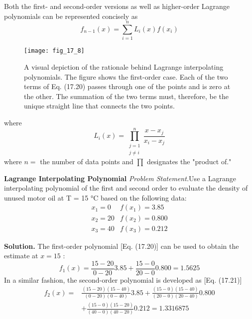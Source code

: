 \documentclass[../main.tex]{subfiles}
\begin{document}
    Both the first- and second-order versions as well as higher-order Lagrange polynomials can be represented concisely as
    \begin{equation}
        \tag{17.22}
    f_{n-1}(x)=\sum_{i=1}^{n} L_{i}(x) f\left(x_{i}\right)
\end{equation}

\begin{figure}[H]
    \centering
    \texttt{[image: fig\_17\_8]}
   \caption{\textsf{A visual depiction of the rationale behind Lagrange interpolating polynomials. The figure shows
   the first-order case. Each of the two terms of Eq. (17.20) passes through one of the points and
   is zero at the other. The summation of the two terms must, therefore, be the unique straight line
   that connects the two points.}}\label{fig:fig_17_8}
\end{figure}

where
\begin{equation}
    \tag{17.23}
L_{i}(x)=\prod_{\substack{j=1 \\ j \neq i}}^{n} \frac{x-x_{j}}{x_{i}-x_{j}}
\end{equation}
where $n=$ the number of data points and $\prod$ designates the "product of."

\begin{exmp} \textbf{Lagrange Interpolating Polynomial}
    \noindent\textit{Problem Statement.}Use a Lagrange interpolating polynomial of the first and second
    order to evaluate the density of unused motor oil at T = 15 °C based on the following data:
    $$
\begin{array}{ll}
x_{1}=0 & f\left(x_{1}\right)=3.85 \\
x_{2}=20 & f\left(x_{2}\right)=0.800 \\
x_{3}=40 & f\left(x_{3}\right)=0.212
\end{array}
$$

    \noindent \textbf{Solution.} The first-order polynomial [Eq. (17.20)] can be used to obtain the estimate at $x=15$ :
    $$
    f_{1}(x)=\frac{15-20}{0-20} 3.85+\frac{15-0}{20-0} 0.800=1.5625
    $$
    In a similar fashion, the second-order polynomial is developed as [Eq. (17.21)]
    $$
    \begin{aligned}
    f_{2}(x)=& \frac{(15-20)(15-40)}{(0-20)(0-40)} 3.85+\frac{(15-0)(15-40)}{(20-0)(20-40)} 0.800 \\
    &+\frac{(15-0)(15-20)}{(40-0)(40-20)} 0.212=1.3316875
    \end{aligned}
    $$
\end{exmp}
\end{document}
